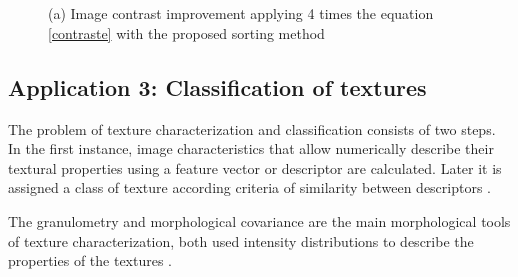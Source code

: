 
\begin{figure}
	\\
	\\
	\caption{(a) Image contrast improvement applying 4 times the equation \ref{contraste} with the proposed sorting method}
  \label{fig:mejora}
\end{figure}


\subsection{Application 3: Classification of textures}

 The problem of texture characterization and classification consists of two steps. In the first instance, image characteristics that allow numerically describe their textural properties using a feature vector or descriptor are calculated. Later it is assigned a class of texture according criteria of similarity between descriptors \cite{hanbury2005illumination}.

The granulometry and morphological covariance are the main morphological tools of texture characterization, both used intensity distributions to describe the properties of the textures \cite{lefevre2009beyond}.



